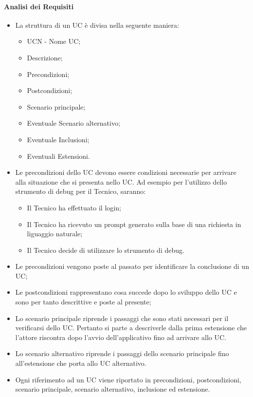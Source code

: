 \paragraph{Analisi dei Requisiti}
\begin{itemize}
  \item La struttura di un UC è divisa nella seguente maniera:
  \begin{itemize}
    \item UCN - Nome UC;
    \item Descrizione;
    \item Precondizioni;
    \item Postcondizioni;
    \item Scenario principale;
    \item Eventuale Scenario alternativo;
    \item Eventuale Inclusioni;
    \item Eventuali Estensioni.
  \end{itemize}
  \item Le precondizioni dello UC devono essere condizioni necessarie per arrivare alla situazione che si presenta nello UC. Ad esempio per l'utilizzo dello strumento di debug per il Tecnico, saranno:
  \begin{itemize}
    \item Il Tecnico ha effettuato il login;
    \item Il Tecnico ha ricevuto un prompt generato sulla base di una richiesta in liguaggio naturale;
    \item Il Tecnico decide di utilizzare lo strumento di debug.
  \end{itemize}
  \item Le precondizioni vengono poste al passato per identificare la conclusione di un UC;
  \item Le postcondizioni rappresentano cosa succede dopo lo sviluppo dello UC e sono per tanto descrittive e poste al presente;
  \item Lo scenario principale riprende i passaggi che sono stati necessari per il verificarsi dello UC. Pertanto si parte a descriverle dalla prima estensione che l'attore riscontra dopo l'avvio dell'applicativo fino ad arrivare allo UC.
  \item Lo scenario alternativo riprende i passaggi dello scenario principale fino all'estensione che porta allo UC alternativo.
  \item Ogni riferimento ad un UC viene riportato in precondizioni, postcondizioni, scenario principale, scenario alternativo, inclusione ed estensione.

\end{itemize}
